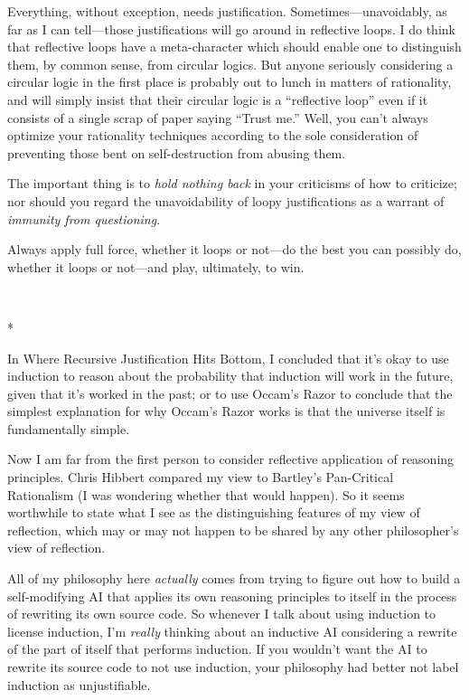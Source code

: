 {
 Everything, without exception, needs justification.
Sometimes---unavoidably, as far as I can tell---those justifications
will go around in reflective loops. I do think that reflective loops
have a meta-character which should enable one to distinguish them, by
common sense, from circular logics. But anyone seriously considering a
circular logic in the first place is probably out to lunch in matters
of rationality, and will simply insist that their circular logic is a
``reflective loop'' even if it
consists of a single scrap of paper saying ``Trust
me.'' Well, you can't always optimize
your rationality techniques according to the sole consideration of
preventing those bent on self-destruction from abusing them.}

{
 The important thing is to \textit{hold nothing back} in your
criticisms of how to criticize; nor should you regard the
unavoidability of loopy justifications as a warrant of \textit{immunity
from questioning}.}

{
 Always apply full force, whether it loops or not---do the best you
can possibly do, whether it loops or not---and play, ultimately, to
win.}

{\centering
 \ ~
\par}

{\centering
 *
\par}


{
 In Where Recursive Justification Hits Bottom, I concluded that
it's okay to use induction to reason about the
probability that induction will work in the future, given that
it's worked in the past; or to use
Occam's Razor to conclude that the simplest explanation
for why Occam's Razor works is that the universe itself
is fundamentally simple. }

{
 Now I am far from the first person to consider reflective
application of reasoning principles. Chris Hibbert compared my view to
Bartley's Pan-Critical Rationalism (I was wondering
whether that would happen). So it seems worthwhile to state what I see
as the distinguishing features of my view of reflection, which may or
may not happen to be shared by any other philosopher's
view of reflection.}

{
 All of my philosophy here \textit{actually} comes from trying to
figure out how to build a self-modifying AI that applies its own
reasoning principles to itself in the process of rewriting its own
source code. So whenever I talk about using induction to license
induction, I'm \textit{really} thinking about an
inductive AI considering a rewrite of the part of itself that performs
induction. If you wouldn't want the AI to rewrite its
source code to not use induction, your philosophy had better not label
induction as unjustifiable.}

